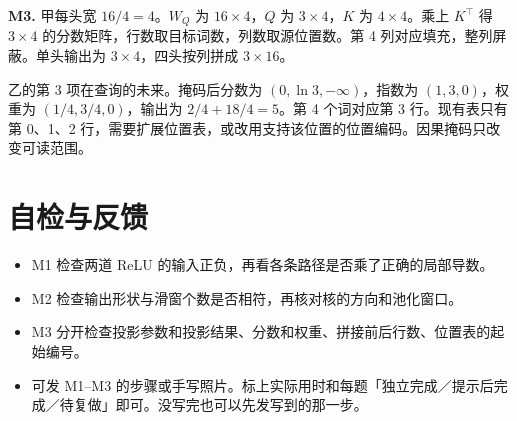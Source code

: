 \documentclass[UTF8,a4paper,11pt]{ctexart}
\begin{document}
\textbf{M3.} 甲每头宽 $16/4=4$。$W_Q$ 为 $16\times4$，$Q$ 为 $3\times4$，$K$ 为 $4\times4$。乘上 $K^\top$ 得 $3\times4$ 的分数矩阵，行数取目标词数，列数取源位置数。第 4 列对应填充，整列屏蔽。单头输出为 $3\times4$，四头按列拼成 $3\times16$。

乙的第 3 项在查询的未来。掩码后分数为 $(0,\ln3,-\infty)$，指数为 $(1,3,0)$，权重为 $(1/4,3/4,0)$，输出为 $2/4+18/4=5$。第 4 个词对应第 3 行。现有表只有第 0、1、2 行，需要扩展位置表，或改用支持该位置的位置编码。因果掩码只改变可读范围。

\section{自检与反馈}
\begin{itemize}
\item M1 检查两道 ReLU 的输入正负，再看各条路径是否乘了正确的局部导数。
\item M2 检查输出形状与滑窗个数是否相符，再核对核的方向和池化窗口。
\item M3 分开检查投影参数和投影结果、分数和权重、拼接前后行数、位置表的起始编号。
\item 可发 M1–M3 的步骤或手写照片。标上实际用时和每题「独立完成／提示后完成／待复做」即可。没写完也可以先发写到的那一步。
\end{itemize}
\end{document}
